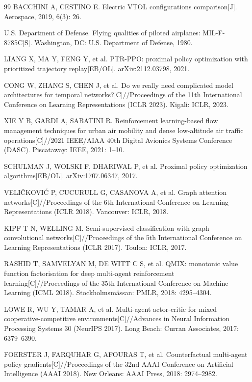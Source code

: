\documentclass[12pt,a4paper,UTF8]{ctexart}
\begin{document}
\begin{thebibliography}{99}
 BACCHINI A, CESTINO E. Electric VTOL configurations comparison[J]. Aerospace, 2019, 6(3): 26.

 U.S. Department of Defense. Flying qualities of piloted airplanes: MIL-F-8785C[S]. Washington, DC: U.S. Department of Defense, 1980.

 LIANG X, MA Y, FENG Y, et al. PTR-PPO: proximal policy optimization with prioritized trajectory replay[EB/OL]. arXiv:2112.03798, 2021.

 CONG W, ZHANG S, CHEN J, et al. Do we really need complicated model architectures for temporal networks?[C]//Proceedings of the 11th International Conference on Learning Representations (ICLR 2023). Kigali: ICLR, 2023.

 XIE Y B, GARDI A, SABATINI R. Reinforcement learning-based flow management techniques for urban air mobility and dense low-altitude air traffic operations[C]//2021 IEEE/AIAA 40th Digital Avionics Systems Conference (DASC). Piscataway: IEEE, 2021: 1--10.

 SCHULMAN J, WOLSKI F, DHARIWAL P, et al. Proximal policy optimization algorithms[EB/OL]. arXiv:1707.06347, 2017.

 VELI\v{C}KOVI\'C P, CUCURULL G, CASANOVA A, et al. Graph attention networks[C]//Proceedings of the 6th International Conference on Learning Representations (ICLR 2018). Vancouver: ICLR, 2018.

 KIPF T N, WELLING M. Semi-supervised classification with graph convolutional networks[C]//Proceedings of the 5th International Conference on Learning Representations (ICLR 2017). Toulon: ICLR, 2017.

 RASHID T, SAMVELYAN M, DE WITT C S, et al. QMIX: monotonic value function factorisation for deep multi-agent reinforcement learning[C]//Proceedings of the 35th International Conference on Machine Learning (ICML 2018). Stockholmsm\"{a}ssan: PMLR, 2018: 4295--4304.

 LOWE R, WU Y, TAMAR A, et al. Multi-agent actor-critic for mixed cooperative-competitive environments[C]//Advances in Neural Information Processing Systems 30 (NeurIPS 2017). Long Beach: Curran Associates, 2017: 6379--6390.

 FOERSTER J, FARQUHAR G, AFOURAS T, et al. Counterfactual multi-agent policy gradients[C]//Proceedings of the 32nd AAAI Conference on Artificial Intelligence (AAAI 2018). New Orleans: AAAI Press, 2018: 2974--2982.


\end{thebibliography}
\end{document}
